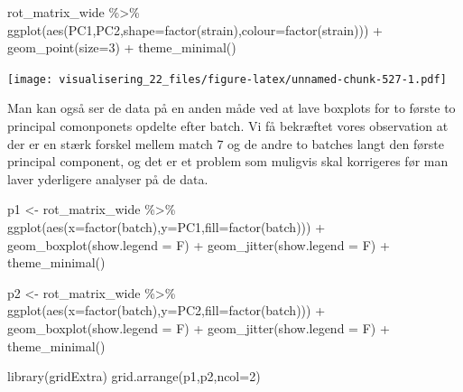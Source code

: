 \documentclass[
]{book}
\newenvironment{Shaded}{\begin{snugshade}}{\end{snugshade}}
\newcommand{\AttributeTok}[1]{\textcolor[rgb]{0.77,0.63,0.00}{#1}}
\newcommand{\DecValTok}[1]{\textcolor[rgb]{0.00,0.00,0.81}{#1}}
\newcommand{\FunctionTok}[1]{\textcolor[rgb]{0.00,0.00,0.00}{#1}}
\newcommand{\NormalTok}[1]{#1}
\newcommand{\OtherTok}[1]{\textcolor[rgb]{0.56,0.35,0.01}{#1}}
\newcommand{\SpecialCharTok}[1]{\textcolor[rgb]{0.00,0.00,0.00}{#1}}
\begin{document}
\begin{Shaded}
\begin{Highlighting}[]
\NormalTok{rot\_matrix\_wide }\SpecialCharTok{\%\textgreater{}\%}
  \FunctionTok{ggplot}\NormalTok{(}\FunctionTok{aes}\NormalTok{(PC1,PC2,}\AttributeTok{shape=}\FunctionTok{factor}\NormalTok{(strain),}\AttributeTok{colour=}\FunctionTok{factor}\NormalTok{(strain))) }\SpecialCharTok{+} 
  \FunctionTok{geom\_point}\NormalTok{(}\AttributeTok{size=}\DecValTok{3}\NormalTok{) }\SpecialCharTok{+}
  \FunctionTok{theme\_minimal}\NormalTok{()}
\end{Highlighting}
\end{Shaded}

\texttt{[image: visualisering\_22\_files/figure-latex/unnamed-chunk-527-1.pdf]}

Man kan også ser de data på en anden måde ved at lave boxplots for to første to principal comonponets opdelte efter batch. Vi få bekræftet vores observation at der er en stærk forskel mellem match 7 og de andre to batches langt den første principal component, og det er et problem som muligvis skal korrigeres før man laver yderligere analyser på de data.

\begin{Shaded}
\begin{Highlighting}[]
\NormalTok{p1 }\OtherTok{\textless{}{-}}\NormalTok{ rot\_matrix\_wide }\SpecialCharTok{\%\textgreater{}\%} 
  \FunctionTok{ggplot}\NormalTok{(}\FunctionTok{aes}\NormalTok{(}\AttributeTok{x=}\FunctionTok{factor}\NormalTok{(batch),}\AttributeTok{y=}\NormalTok{PC1,}\AttributeTok{fill=}\FunctionTok{factor}\NormalTok{(batch))) }\SpecialCharTok{+} \FunctionTok{geom\_boxplot}\NormalTok{(}\AttributeTok{show.legend =}\NormalTok{ F) }\SpecialCharTok{+} \FunctionTok{geom\_jitter}\NormalTok{(}\AttributeTok{show.legend =}\NormalTok{ F) }\SpecialCharTok{+} \FunctionTok{theme\_minimal}\NormalTok{()}

\NormalTok{p2 }\OtherTok{\textless{}{-}}\NormalTok{ rot\_matrix\_wide }\SpecialCharTok{\%\textgreater{}\%} 
  \FunctionTok{ggplot}\NormalTok{(}\FunctionTok{aes}\NormalTok{(}\AttributeTok{x=}\FunctionTok{factor}\NormalTok{(batch),}\AttributeTok{y=}\NormalTok{PC2,}\AttributeTok{fill=}\FunctionTok{factor}\NormalTok{(batch))) }\SpecialCharTok{+} \FunctionTok{geom\_boxplot}\NormalTok{(}\AttributeTok{show.legend =}\NormalTok{ F) }\SpecialCharTok{+} \FunctionTok{geom\_jitter}\NormalTok{(}\AttributeTok{show.legend =}\NormalTok{ F) }\SpecialCharTok{+} \FunctionTok{theme\_minimal}\NormalTok{()}

\FunctionTok{library}\NormalTok{(gridExtra)}
\FunctionTok{grid.arrange}\NormalTok{(p1,p2,}\AttributeTok{ncol=}\DecValTok{2}\NormalTok{)}
\end{Highlighting}
\end{Shaded}
\end{document}
